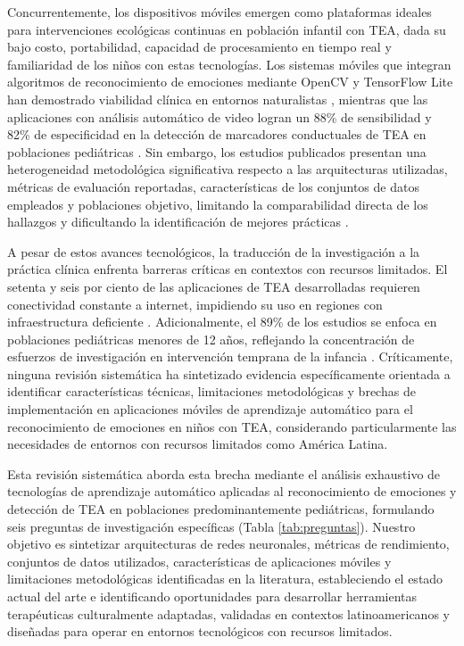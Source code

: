 \documentclass{ieeeaccess}
\begin{document}
	Concurrentemente, los dispositivos móviles emergen como plataformas ideales para intervenciones ecológicas continuas en población infantil con TEA, dada su bajo costo, portabilidad, capacidad de procesamiento en tiempo real y familiaridad de los niños con estas tecnologías. Los sistemas móviles que integran algoritmos de reconocimiento de emociones mediante OpenCV y TensorFlow Lite han demostrado viabilidad clínica en entornos naturalistas \cite{b3,b8}, mientras que las aplicaciones con análisis automático de video logran un 88\% de sensibilidad y 82\% de especificidad en la detección de marcadores conductuales de TEA en poblaciones pediátricas \cite{b9}. Sin embargo, los estudios publicados presentan una heterogeneidad metodológica significativa respecto a las arquitecturas utilizadas, métricas de evaluación reportadas, características de los conjuntos de datos empleados y poblaciones objetivo, limitando la comparabilidad directa de los hallazgos y dificultando la identificación de mejores prácticas \cite{b10}.
	
	A pesar de estos avances tecnológicos, la traducción de la investigación a la práctica clínica enfrenta barreras críticas en contextos con recursos limitados. El setenta y seis por ciento de las aplicaciones de TEA desarrolladas requieren conectividad constante a internet, impidiendo su uso en regiones con infraestructura deficiente \cite{b11}. Adicionalmente, el 89\% de los estudios se enfoca en poblaciones pediátricas menores de 12 años, reflejando la concentración de esfuerzos de investigación en intervención temprana de la infancia \cite{b4,b5}. Críticamente, ninguna revisión sistemática ha sintetizado evidencia específicamente orientada a identificar características técnicas, limitaciones metodológicas y brechas de implementación en aplicaciones móviles de aprendizaje automático para el reconocimiento de emociones en niños con TEA, considerando particularmente las necesidades de entornos con recursos limitados como América Latina.
	
	Esta revisión sistemática aborda esta brecha mediante el análisis exhaustivo de tecnologías de aprendizaje automático aplicadas al reconocimiento de emociones y detección de TEA en poblaciones predominantemente pediátricas, formulando seis preguntas de investigación específicas (Tabla \ref{tab:preguntas}). Nuestro objetivo es sintetizar arquitecturas de redes neuronales, métricas de rendimiento, conjuntos de datos utilizados, características de aplicaciones móviles y limitaciones metodológicas identificadas en la literatura, estableciendo el estado actual del arte e identificando oportunidades para desarrollar herramientas terapéuticas culturalmente adaptadas, validadas en contextos latinoamericanos y diseñadas para operar en entornos tecnológicos con recursos limitados.
	
\end{document}
